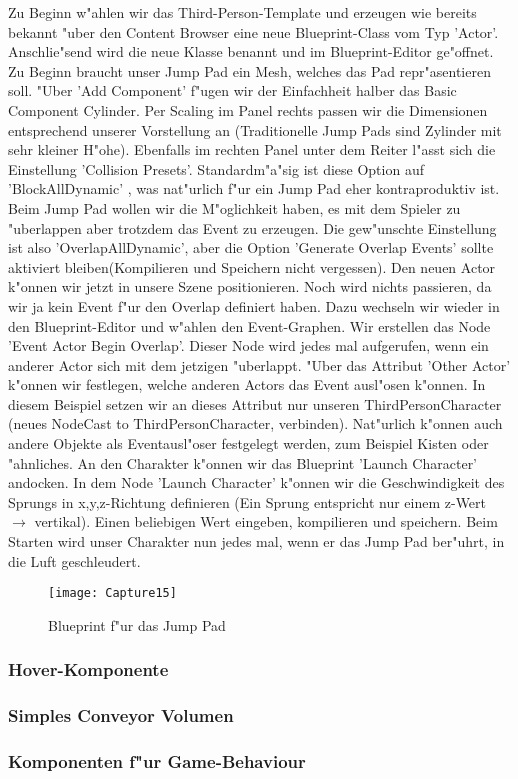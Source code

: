 \documentclass[11pt, titlepage]{article}
\begin{document}
\noindent Zu Beginn w"ahlen wir das Third-Person-Template und erzeugen wie bereits bekannt "uber den Content Browser eine neue Blueprint-Class vom Typ 'Actor'. Anschlie"send wird die neue Klasse benannt und im Blueprint-Editor ge"offnet. \newline
\newline
\noindent Zu Beginn braucht unser Jump Pad ein Mesh, welches das Pad repr"asentieren soll. "Uber 'Add Component' f"ugen wir der Einfachheit halber das Basic Component  Cylinder. Per Scaling im Panel rechts passen wir die Dimensionen entsprechend unserer Vorstellung an (Traditionelle Jump Pads sind Zylinder mit sehr kleiner H"ohe). Ebenfalls im rechten Panel unter dem Reiter l"asst sich die Einstellung 'Collision Presets'. Standardm"a"sig ist diese Option auf 'BlockAllDynamic' , was nat"urlich  f"ur ein Jump Pad eher kontraproduktiv ist. Beim Jump Pad wollen wir die M"oglichkeit haben, es mit dem Spieler zu "uberlappen aber trotzdem das Event zu erzeugen. Die gew"unschte Einstellung ist also 'OverlapAllDynamic', aber die Option  'Generate Overlap Events' sollte aktiviert bleiben(Kompilieren und Speichern nicht vergessen).  \newline
\newline
\noindent Den neuen Actor k"onnen wir jetzt in unsere Szene positionieren. Noch wird nichts passieren, da wir ja kein Event f"ur den Overlap definiert haben. Dazu wechseln wir wieder in den Blueprint-Editor und w"ahlen den Event-Graphen. Wir erstellen das Node 'Event Actor Begin Overlap'. Dieser Node wird jedes mal aufgerufen, wenn ein anderer Actor sich mit dem jetzigen "uberlappt. "Uber das Attribut 'Other Actor' k"onnen wir festlegen, welche anderen Actors das Event ausl"osen k"onnen. In diesem Beispiel setzen wir an dieses Attribut nur unseren ThirdPersonCharacter (neues NodeCast to ThirdPersonCharacter, verbinden). Nat"urlich k"onnen auch andere Objekte als Eventausl"oser festgelegt werden, zum Beispiel Kisten oder "ahnliches. An den Charakter k"onnen wir das Blueprint 'Launch Character' andocken. In dem Node 'Launch Character' k"onnen wir die Geschwindigkeit des Sprungs in x,y,z-Richtung definieren (Ein Sprung entspricht nur einem z-Wert $\rightarrow$ vertikal). Einen beliebigen Wert eingeben, kompilieren und speichern. Beim Starten wird unser Charakter nun jedes mal, wenn er das Jump Pad ber"uhrt, in die Luft geschleudert.

\begin{figure}[h]
\texttt{[image: Capture15]}
\caption{Blueprint f"ur das Jump Pad}
\end{figure}

\subsubsection{Hover-Komponente}

\noindent 


\subsubsection{Simples Conveyor Volumen}
\subsubsection{Komponenten f"ur Game-Behaviour}
\end{document}
